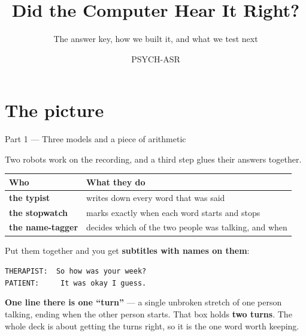\documentclass[aspectratio=169]{beamer}
\title{Did the Computer Hear It Right?}
\subtitle{The answer key, how we built it, and what we test next}
\author{PSYCH-ASR}
\date{}
\newcommand{\keybox}[1]{%
  \par\vspace{4pt}\begingroup\centering
  \colorbox{warmbg}{\parbox{0.93\textwidth}{\centering #1}}%
  \par\endgroup\vspace{2pt}}
\newenvironment{nicetable}[1]
  {\par\vspace{2pt}\begingroup\centering\small
   \renewcommand{\arraystretch}{1.18}%
   \setlength{\tabcolsep}{6pt}\rowcolors{2}{band}{white}%
   \begin{tabular}{#1}\arrayrulecolor{hdr}\toprule}
  {\bottomrule\end{tabular}\par\endgroup\vspace{2pt}}
\newcommand{\hd}[1]{\textcolor{hdr}{\textbf{#1}}}
\newcommand{\typist}{\textbf{the typist}}
\newcommand{\timer}{\textbf{the stopwatch}}
\newcommand{\tagger}{\textbf{the name-tagger}}
\begin{document}
\frame{\titlepage}

\section{The picture}
\begin{frame}{Part 1 --- Three models and a piece of arithmetic}

Two robots work on the recording, and a third step glues their answers together.

\begin{nicetable}{ll}
\hd{Who} & \hd{What they do} \\ \midrule
\typist{}      & writes down every word that was said \\
\timer{}       & marks exactly when each word starts and stops \\
\tagger{}      & decides which of the two people was talking, and when \\
\end{nicetable}

\vspace{0.3em}
Put them together and you get \textbf{subtitles with names on them}:

\begin{center}
\small
\colorbox{band}{\parbox{0.62\textwidth}{\texttt{THERAPIST:~~So how was your week?}\\
\texttt{PATIENT:~~~~~It was okay I guess.}}}
\end{center}

\vspace{0.2em}
\keybox{\textbf{One line there is one ``turn''} --- a single unbroken stretch of one person
talking, ending when the other person starts. That box holds \textbf{two turns}. The whole
deck is about getting the turns right, so it is the one word worth keeping.}

\end{frame}
\end{document}
